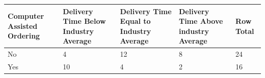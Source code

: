 \documentclass[]{book}
\begin{document}
\begin{longtable}[]{@{}lllll@{}}
\toprule
\begin{minipage}[b]{0.16\columnwidth}\raggedright
Computer Assisted Ordering\strut
\end{minipage} & \begin{minipage}[b]{0.18\columnwidth}\raggedright
Delivery Time Below Industry Average\strut
\end{minipage} & \begin{minipage}[b]{0.19\columnwidth}\raggedright
Delivery Time Equal to Industry Average\strut
\end{minipage} & \begin{minipage}[b]{0.15\columnwidth}\raggedright
Delivery Time Above industry Average\strut
\end{minipage} & \begin{minipage}[b]{0.18\columnwidth}\raggedright
Row Total\strut
\end{minipage}\tabularnewline
\midrule
\endhead
\begin{minipage}[t]{0.16\columnwidth}\raggedright
No\strut
\end{minipage} & \begin{minipage}[t]{0.18\columnwidth}\raggedright
4\strut
\end{minipage} & \begin{minipage}[t]{0.19\columnwidth}\raggedright
12\strut
\end{minipage} & \begin{minipage}[t]{0.15\columnwidth}\raggedright
8\strut
\end{minipage} & \begin{minipage}[t]{0.18\columnwidth}\raggedright
24\strut
\end{minipage}\tabularnewline
\begin{minipage}[t]{0.16\columnwidth}\raggedright
Yes\strut
\end{minipage} & \begin{minipage}[t]{0.18\columnwidth}\raggedright
10\strut
\end{minipage} & \begin{minipage}[t]{0.19\columnwidth}\raggedright
4\strut
\end{minipage} & \begin{minipage}[t]{0.15\columnwidth}\raggedright
2\strut
\end{minipage} & \begin{minipage}[t]{0.18\columnwidth}\raggedright
16\strut
\end{minipage}\tabularnewline

\end{longtable}
\end{document}
